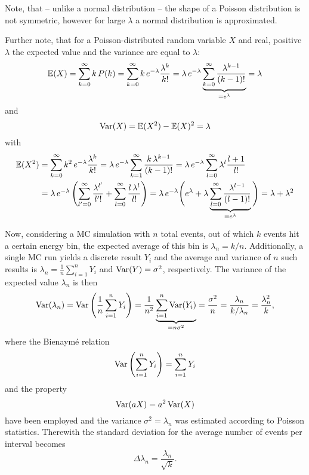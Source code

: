 Note, that -- unlike a normal distribution -- the shape of a Poisson
distribution is not symmetric, however for large $\lambda$ a normal
distribution is approximated.

Further note, that for a Poisson-distributed random variable $X$ and real,
positive $\lambda$ the expected value and the variance are equal to $\lambda$:
\begin{equation}
    \operatorname{\mathbb{E}}(X)=\sum_{k=0}^{\infty}k\,P(k)
    =\sum_{k=0}^{\infty}k\,e^{-\lambda}\frac{\lambda^k}{k!}
    =\lambda\,e^{-\lambda}
    \underbrace{\sum_{k=0}^{\infty}\frac{\lambda^{k-1}}{(k-1)!}}_{=e^{\lambda}}
    =\lambda
    \label{eq:poisson-exp}
\end{equation}
and
\begin{equation}
    \operatorname{Var}(X)=\operatorname{\mathbb{E}}(X^2)-\operatorname{\mathbb{E}}(X)^2=\lambda
    \label{eq:possion-var}
\end{equation}
with
\begin{align*}
    \Ex(X^2)&=\sum_{k=0}^{\infty}k^2\,e^{-\lambda}\frac{\lambda^k}{k!}
    =\lambda\,e^{-\lambda}\sum_{k=1}^{\infty}\frac{k\,\lambda^{k-1}}{(k-1)!}
    =\lambda\,e^{-\lambda}\sum_{l=0}^{\infty}\lambda^l\frac{l+1}{l!}
    \\
    &=\lambda\,e^{-\lambda}\left(
    \sum_{l'=0}^{\infty}\frac{\lambda^{l'}}{l'!}
    +\sum_{l=0}^{\infty}\frac{l\,\lambda^l}{l!}
    \right)
    =\lambda\,e^{-\lambda}\Bigg(
    e^{\lambda}+\lambda\underbrace{%
        \sum_{l=0}^{\infty}\frac{\lambda^{l-1}}{(l-1)!}}_{=e^\lambda}
    \Bigg)
    =\lambda+\lambda^2
\end{align*}

Now, considering a MC simulation with $n$ total events, out of which $k$ events
hit a certain energy bin, the expected average of this bin is $\lambda_n=k/n$.
Additionally, a single MC run yields a discrete result $Y_i$ and the average
and variance of $n$ such results is $\lambda_n=\frac{1}{n}\sum_{i=1}^{n}Y_i$
and $\operatorname{Var}(Y)=\sigma^2$, respectively.
The variance of the expected value $\lambda_n$ is then
\begin{equation}
    \operatorname{Var}(\lambda_n)=\operatorname{Var}\left(\frac{1}{n}\sum_{i=1}^{n}Y_i\right)
    =\frac{1}{n^2}\underbrace{\sum_{i=1}^{n}\operatorname{Var}(Y_i)}_{=n\sigma^2}
    =\frac{\sigma^2}{n}=\frac{\lambda_n}{k/\lambda_n}=\frac{\lambda_n^2}{k},
\end{equation}
where the Bienaymé relation
\begin{equation*}
    \operatorname{Var}\left(\sum_{i=1}^{n}Y_i\right)=\sum_{i=1}^{n}Y_i
\end{equation*}
and the property
\begin{equation*}
    \operatorname{Var}(aX)=a^2\operatorname{Var}(X)
\end{equation*}
have been employed and the variance $\sigma^2=\lambda_n$ was estimated
according to Poisson statistics.
Therewith the standard deviation for the average number of events per interval
becomes
\begin{equation}
    \Delta\lambda_n=\frac{\lambda_n}{\sqrt{k}}.
    \label{eq:mc-std}
\end{equation}

